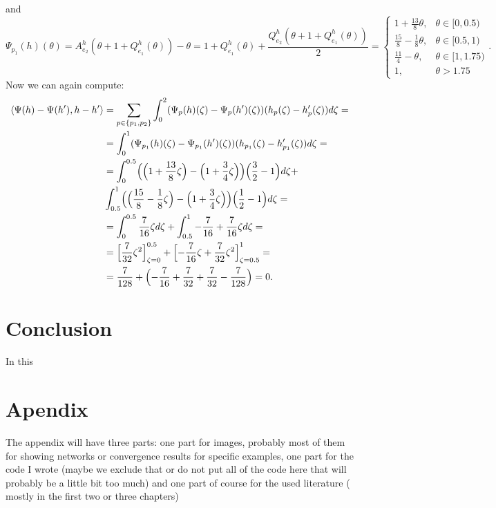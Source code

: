 \documentclass[reqno,openany]{amsbook}
\theoremstyle{definition}
\theoremstyle{plain}
\begin{document}
and 
\[\Psi_{p_1}(h)(\theta) =A_{e_2}^h(\theta + 1 + Q_{e_1}^h(\theta)) - \theta = 
1 + Q_{e_1}^h(\theta) + \frac{Q_{e_2}^h(\theta + 1 + Q_{e_1}^h(\theta))}{2} = \begin{cases} 1 + \frac{13}{8}\theta,& \theta \in [0, 0.5) \\ \frac{15}{8} - \frac{1}{8}\theta,& \theta \in [0.5, 1) \\ \frac{11}{4} - \theta,& \theta \in [1, 1.75) \\ 1,& \theta  > 1.75 \end{cases}. \]
Now we can again compute:
\begin{align}
	\begin{split}
		\langle \Psi(h) - \Psi(h^{\prime}), h - h^{\prime} \rangle &= \sum_{p \in \{p_1, p_2\}} \int_0^2 (\Psi_p(h)(\zeta) - 
		\Psi_p(h^{\prime})(\zeta))(h_p(\zeta) - h_p^{\prime}(\zeta)) d\zeta =\\
		&= \int_0^1 (\Psi_{p_1}(h)(\zeta) - \Psi_{p_1}(h^{\prime})(\zeta))(h_{p_1}(\zeta) - h_{p_1}^{\prime}(\zeta)) d\zeta =\\
		&= \int_0^{0.5} \Bigl(\Bigl(1 + \frac{13}{8}\zeta\Bigr) - \Bigl(1 + \frac{3}{4}\zeta\Bigr)\Bigr)\Bigl(\frac{3}{2} - 						1\Bigr) d\zeta + \\
		&\int_{0.5}^{1} \Bigl(\Bigl(\frac{15}{8} - \frac{1}{8}\zeta\Bigr)  - \Bigl(1 + \frac{3}{4}\zeta\Bigr)\Bigr)								\Bigl(\frac{1}{2} - 1\Bigr) d\zeta =  \\
		&= \int_0^{0.5} \frac{7}{16}\zeta d\zeta + \int_{0.5}^{1} -\frac{7}{16} + \frac{7}{16}\zeta d\zeta = \\
		&= \Bigl[\frac{7}{32}\zeta^2\Bigr]_{\zeta = 0}^{0.5} + \Bigl[-\frac{7}{16}\zeta 
		+ \frac{7}{32}\zeta^2\Bigr]_{\zeta = 0.5}^{1} =\\
		&= \frac{7}{128} + \Bigl(-\frac{7}{16} + \frac{7}{32} + 
		 \frac{7}{32} - \frac{7}{128}\Bigr) = 0.
	\end{split}
\end{align}

 






\chapter{Conclusion}
In this 





\chapter{Apendix}
The appendix will have three parts: one part for images, probably most of them for showing networks or convergence results for specific examples, one part for the code I wrote (maybe we exclude that or do not put all of the code here that will probably be a little bit too much) and one part of course for the used literature ( mostly in the first two or three chapters)



\end{document}

